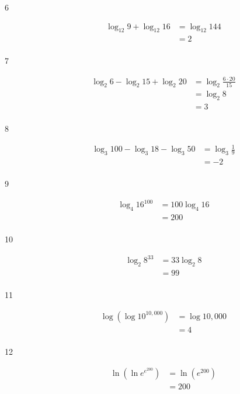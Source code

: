 \documentclass{exam}
\begin{document}
\begin{description}
      \item[6] 
        \begin{align*}
          \log_{12} 9 + \log_{12} 16 &= \log_{12} 144 \\
                                     &= \boxed{2} \\
        \end{align*}

      \item[7] 
        \begin{align*}
          \log_2 6 - \log_2 15 + \log_2 20 &= \log_2 \frac{6 \cdot 20}{15} \\
                                           &= \log_2 8 \\
                                           &= \boxed{3} \\
        \end{align*}

      \item[8] 
        \begin{align*}
          \log_3 100 - \log_3 18 - \log_3 50 &= \log_3 \frac{1}{9} \\
                                             &= \boxed{-2} \\
        \end{align*}

      \item[9] 
        \begin{align*}
          \log_4 16^{100} &= 100 \log_4 16 \\
                          &= \boxed{200} \\
        \end{align*}

      \item[10] 
        \begin{align*}
          \log_2 8^{33} &= 33 \log_2 8 \\
                        &= \boxed{99} \\
        \end{align*}

      \item[11] 
        \begin{align*}
          \log \left( \log 10^{10,000} \right) &= \log 10,000 \\
                                               &= \boxed{4} \\
        \end{align*}

      \item[12] 
        \begin{align*}
          \ln \left( \ln e^{e^{200}} \right) &= \ln \left( e^{200} \right) \\
                                             &= \boxed{200} \\
        \end{align*}


\end{description}
\end{document}
